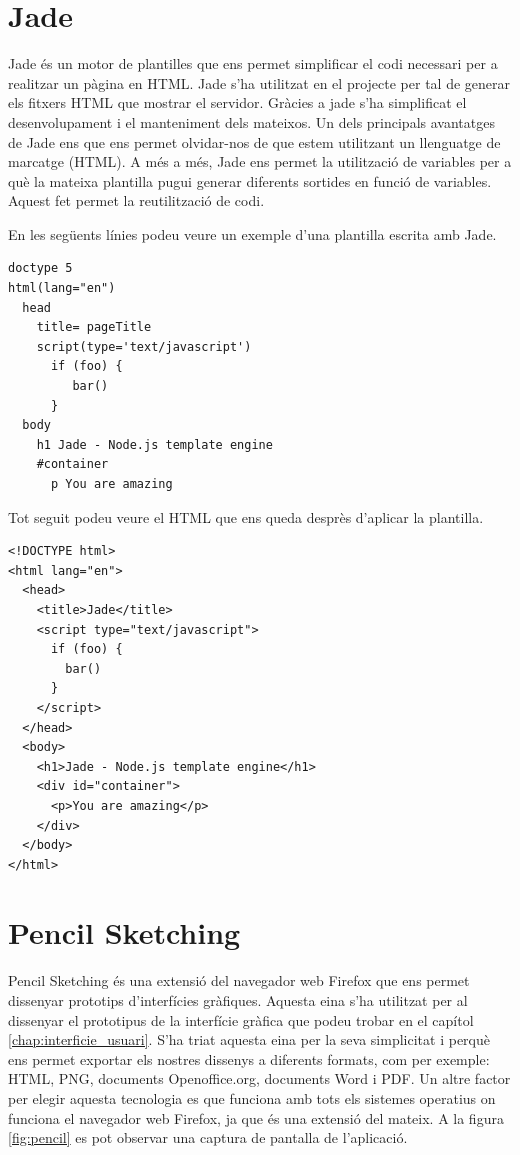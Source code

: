 \section{Jade}

Jade és un motor de plantilles que ens permet simplificar el codi necessari per a realitzar un pàgina en HTML. Jade s'ha utilitzat en el projecte per tal de generar els fitxers HTML que mostrar el servidor. Gràcies a jade s'ha simplificat el desenvolupament i el manteniment dels mateixos. Un dels principals avantatges de Jade ens que ens permet olvidar-nos de que estem utilitzant un llenguatge de marcatge (HTML). A més a més, Jade ens permet la utilització de variables per a què la mateixa plantilla pugui generar diferents sortides en funció de variables. Aquest fet permet la reutilització de codi.

En les següents línies podeu veure un exemple d'una plantilla escrita amb Jade. 

\begin{lstlisting}
doctype 5
html(lang="en")
  head
    title= pageTitle
    script(type='text/javascript')
      if (foo) {
         bar()
      }
  body
    h1 Jade - Node.js template engine
    #container
      p You are amazing
\end{lstlisting}

Tot seguit podeu veure el HTML que ens queda desprès d'aplicar la plantilla. 

\begin{lstlisting}
<!DOCTYPE html>
<html lang="en">
  <head>
    <title>Jade</title>
    <script type="text/javascript">
      if (foo) {
        bar()
      }
    </script>
  </head>
  <body>
    <h1>Jade - Node.js template engine</h1>
    <div id="container">
      <p>You are amazing</p>
    </div>
  </body>
</html>	
\end{lstlisting}

\section{Pencil Sketching}
\label{sec:pencil sketcing}
Pencil Sketching és una extensió del navegador web Firefox que ens permet dissenyar prototips d'interfícies gràfiques. Aquesta eina s'ha utilitzat per al dissenyar el prototipus de la interfície gràfica que podeu trobar en el capítol \ref{chap:interficie_usuari}. S'ha triat aquesta eina per la seva simplicitat i perquè ens permet exportar els nostres dissenys a diferents formats, com per exemple: HTML, PNG, documents Openoffice.org, documents Word i PDF. Un altre factor per elegir aquesta tecnologia es que funciona amb tots els sistemes operatius on funciona el navegador web Firefox, ja que és una extensió del mateix. A la figura \ref{fig:pencil} es pot observar una captura de pantalla de l'aplicació. 

